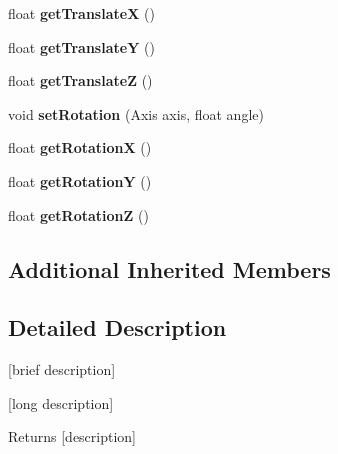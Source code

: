 \begin{DoxyCompactItemize}
\item 
\hypertarget{class_object2_d_a296217271f737141b4cda09c1347a8b0}{float {\bfseries get\-Translate\-X} ()}\label{class_object2_d_a296217271f737141b4cda09c1347a8b0}

\item 
\hypertarget{class_object2_d_a7269f877b6ba784bd982e145b3cde40a}{float {\bfseries get\-Translate\-Y} ()}\label{class_object2_d_a7269f877b6ba784bd982e145b3cde40a}

\item 
\hypertarget{class_object2_d_a80e3245c977d904af2e60d5321e57d58}{float {\bfseries get\-Translate\-Z} ()}\label{class_object2_d_a80e3245c977d904af2e60d5321e57d58}

\item 
\hypertarget{class_object2_d_acaac60e76eb6bca23216293961cede8e}{void {\bfseries set\-Rotation} (Axis axis, float angle)}\label{class_object2_d_acaac60e76eb6bca23216293961cede8e}

\item 
\hypertarget{class_object2_d_ab3a5b9b3570efb91a7ba248015b90ef3}{float {\bfseries get\-Rotation\-X} ()}\label{class_object2_d_ab3a5b9b3570efb91a7ba248015b90ef3}

\item 
\hypertarget{class_object2_d_a357e962fc8e9920c1710e33813b2867e}{float {\bfseries get\-Rotation\-Y} ()}\label{class_object2_d_a357e962fc8e9920c1710e33813b2867e}

\item 
\hypertarget{class_object2_d_a1e8e73a4ac5183df5766c23f77288b9a}{float {\bfseries get\-Rotation\-Z} ()}\label{class_object2_d_a1e8e73a4ac5183df5766c23f77288b9a}

\end{DoxyCompactItemize}
\subsection*{Additional Inherited Members}


\subsection{Detailed Description}
\mbox{[}brief description\mbox{]} 

\mbox{[}long description\mbox{]} \begin{DoxyReturn}{Returns}
\mbox{[}description\mbox{]} 
\end{DoxyReturn}


